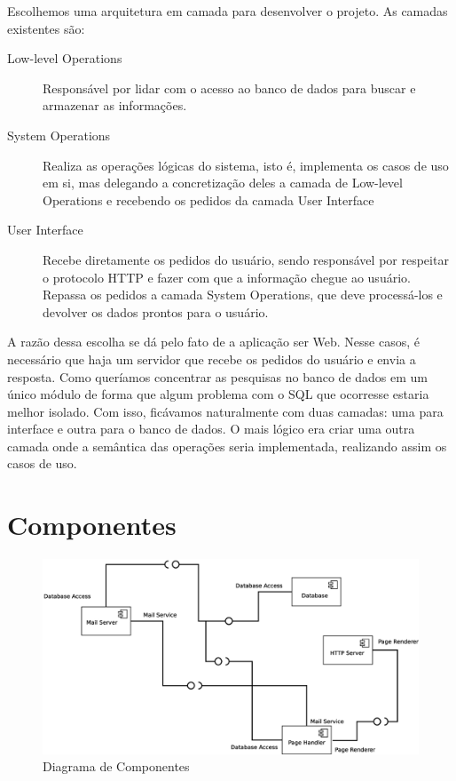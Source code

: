 \documentclass[a4paper]{article}
\begin{document}
	Escolhemos uma arquitetura em camada para desenvolver o projeto. As camadas existentes são:
	\begin{description}
	 \item [Low-level Operations] Responsável por lidar com o acesso ao banco de dados para buscar e armazenar as informações.
	 \item [System Operations] Realiza as operações lógicas do sistema, isto é, implementa os casos de uso em si, mas delegando a concretização deles a camada de Low-level Operations e recebendo os pedidos da camada User Interface
	 \item [User Interface] Recebe diretamente os pedidos do usuário, sendo responsável por respeitar o protocolo HTTP e fazer com que a informação chegue ao usuário. Repassa os pedidos a camada System Operations, que deve processá-los e devolver os dados prontos para o usuário.
	\end{description}
	
	A razão dessa escolha se dá pelo fato de a aplicação ser Web. Nesse casos, é necessário que haja um servidor que recebe os pedidos do usuário e envia a resposta. Como queríamos concentrar as pesquisas no banco de dados em um único módulo de forma que algum problema com o SQL que ocorresse estaria melhor isolado. Com isso, ficávamos naturalmente com duas camadas: uma para interface e outra para o banco de dados. O mais lógico era criar uma outra camada onde a semântica das operações seria implementada, realizando assim os casos de uso.

	
\section{Componentes}
 
 \begin{figure}[H]
  \includegraphics[angle=90,totalheight=0.9\textheight]{componentes.eps}
  \caption{Diagrama de Componentes}
 \end{figure}
 
\end{document}

